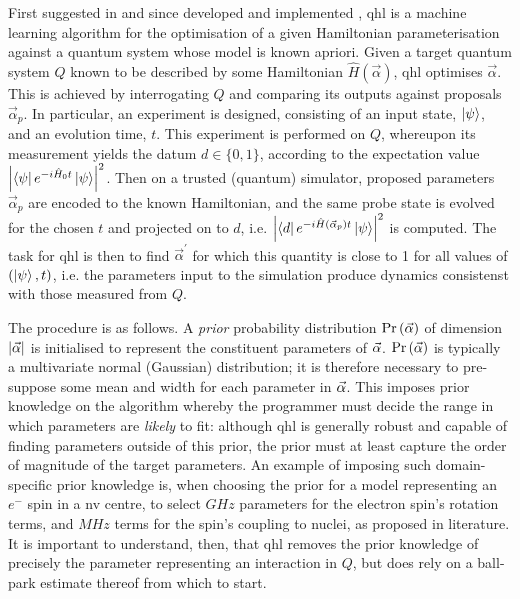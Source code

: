 First suggested in \cite{Granade:2012kj} and since developed \cite{wiebe2014qhlpra, Wiebe:2014qhl} 
    and implemented \cite{wang2017experimental,gentile2020learning}, 
\gls{qhl} is a machine learning algorithm for the optimisation of a given Hamiltonian parameterisation 
    against a quantum system whose model is known apriori. 
Given a target quantum system $Q$ known to be described by some Hamiltonian $\hat{H}(\vec{\alpha})$, 
    \gls{qhl} optimises $\vec{\alpha}$.
This is achieved by interrogating $Q$ and comparing its outputs against proposals $\vec{\alpha}_p$. 
In particular, an experiment is designed, consisting of an input state, $\ket{\psi}$, and an evolution time, $t$.
This experiment is performed on $Q$, whereupon its measurement yields the datum $d \in \{0, 1\}$, 
    according to the expectation value $\left| \bra{\psi} e^{-i \hat{H}_0 t} \ket{\psi} \right|^2$. 
Then on a trusted (quantum) simulator, proposed parameters $\vec{\alpha}_p$ are encoded to the 
    known Hamiltonian, and the same probe state is evolved for the chosen $t$ and projected on to $d$, 
    i.e. $\left| \bra{d} e^{-i \hat{H}(\vec{\alpha}_p) t } \ket{\psi} \right|^2 $ is computed.
The task for \gls{qhl} is then to find $\vec{\alpha}^{\prime}$ for which this quantity 
    is close to 1 for all values of $(\ket{\psi}, t)$, 
    i.e. the parameters input to the simulation produce dynamics consistenst with those measured from $Q$.
\par 

The procedure is as follows. 
A \emph{prior} probability distribution $\Pr\left(\vec{\alpha}\right)$ of dimension $\left| \vec{\alpha} \right|$ 
    is initialised to represent the constituent parameters of $\vec{\alpha}$. 
$\Pr\left(\vec{\alpha}\right)$ is typically a multivariate normal (Gaussian) distribution; 
    it is therefore necessary to pre-suppose some mean and width for each parameter in $\vec{\alpha}$. 
This imposes prior knowledge on the algorithm whereby the programmer must decide the range in 
    which parameters are \emph{likely} to fit:
    although \gls{qhl} is generally robust and capable of finding parameters outside of this prior,
    the prior must at least capture the order of magnitude of the target parameters. 
An example of imposing such domain-specific prior knowledge is, 
    when choosing the prior for a model representing an $e^-$ spin in a \gls{nv} centre,
    to select $GHz$ parameters for the electron spin's rotation terms, and $MHz$ terms 
    for the spin's coupling to nuclei, as proposed in literature. 
It is important to understand, then, that \gls{qhl} removes the prior knowledge 
    of precisely the parameter representing an interaction in $Q$, but does rely on a ball-park estimate thereof from which to start. 
\par 

